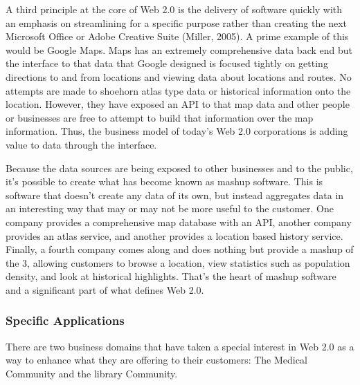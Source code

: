 \documentclass[12pt,oneside,letterpaper]{article}
\begin{document}
A third principle at the core of Web 2.0 is the delivery of software quickly
with an emphasis on streamlining for a specific purpose rather than creating the
next Microsoft Office or Adobe Creative Suite (Miller, 2005).  A prime example
of this would be Google Maps.  Maps has an extremely comprehensive data back end
but the interface to that data that Google designed is focused tightly on
getting directions to and from locations and viewing data about locations and
routes.  No attempts are made to shoehorn atlas type data or historical
information onto the location.  However, they have exposed an API to that map
data and other people or businesses are free to attempt to build that
information over the map information.  Thus, the business model of today's Web
2.0 corporations is adding value to data through the interface.

Because the data sources are being exposed to other businesses and to the
public, it's possible to create what has become known as mashup software.  This
is software that doesn't create any data of its own, but instead aggregates data
in an interesting way that may or may not be more useful to the customer.  One
company provides a comprehensive map database with an API, another company
provides an atlas service, and another provides a location based history
service.  Finally, a fourth company comes along and does nothing but provide a
mashup of the 3, allowing customers to browse a location, view statistics such
as population density, and look at historical highlights.  That's the heart of
mashup software and a significant part of what defines Web 2.0.

\subsubsection{Specific Applications}

There are two business domains that have taken a special interest in Web 2.0 as
a way to enhance what they are offering to their customers: The Medical
Community and the library Community.
\end{document}
